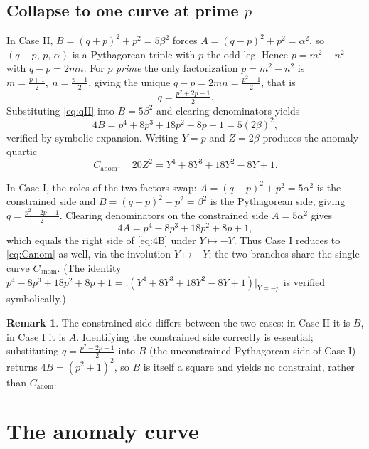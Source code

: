 \documentclass[11pt,reqno]{amsart}
\theoremstyle{plain}
\theoremstyle{definition}
\newtheorem{remark}{Remark}
\newcommand{\Canom}{C_{\mathrm{anom}}}
\begin{document}
\subsection{Collapse to one curve at prime $p$}
In Case II, $B=(q+p)^{2}+p^{2}=5\beta^{2}$ forces $A=(q-p)^{2}+p^{2}=\alpha^{2}$, so
$(q-p,\,p,\,\alpha)$ is a Pythagorean triple with $p$ the odd leg. Hence
$p=m^{2}-n^{2}$ with $q-p=2mn$. For $p$ \emph{prime} the only factorization
$p=m^{2}-n^{2}$ is $m=\tfrac{p+1}{2},\ n=\tfrac{p-1}{2}$, giving the unique
$q-p=2mn=\tfrac{p^{2}-1}{2}$, that is
\begin{equation}\label{eq:qII}
q=\tfrac{p^{2}+2p-1}{2}.
\end{equation}
Substituting \eqref{eq:qII} into $B=5\beta^{2}$ and clearing denominators yields
\begin{equation}\label{eq:4B}
4B=p^{4}+8p^{3}+18p^{2}-8p+1=5(2\beta)^{2},
\end{equation}
verified by symbolic expansion. Writing $Y=p$ and $Z=2\beta$ produces the anomaly
quartic
\begin{equation}\label{eq:Canom}
\Canom\colon\quad 20Z^{2}=Y^{4}+8Y^{3}+18Y^{2}-8Y+1 .
\end{equation}

In Case I, the roles of the two factors swap: $A=(q-p)^{2}+p^{2}=5\alpha^{2}$ is the
constrained side and $B=(q+p)^{2}+p^{2}=\beta^{2}$ is the Pythagorean side, giving
$q=\tfrac{p^{2}-2p-1}{2}$. Clearing denominators on the constrained side $A=5\alpha^{2}$
gives
\begin{equation}\label{eq:4A}
4A=p^{4}-8p^{3}+18p^{2}+8p+1,
\end{equation}
which equals the right side of \eqref{eq:4B} under $Y\mapsto -Y$. Thus Case I reduces to
\eqref{eq:Canom} as well, via the involution $Y\mapsto-Y$; the two branches share the
single curve $\Canom$. (The identity $p^{4}-8p^{3}+18p^{2}+8p+1=
\bigl.(Y^{4}+8Y^{3}+18Y^{2}-8Y+1)\bigr|_{Y=-p}$ is verified symbolically.)

\begin{remark}
The constrained side differs between the two cases: in Case II it is $B$, in Case I it is
$A$. Identifying the constrained side correctly is essential; substituting
$q=\tfrac{p^{2}-2p-1}{2}$ into $B$ (the unconstrained Pythagorean side of Case I) returns
$4B=(p^{2}+1)^{2}$, so $B$ is itself a square and yields no constraint, rather than
$\Canom$.
\end{remark}

\section{The anomaly curve}
\end{document}
